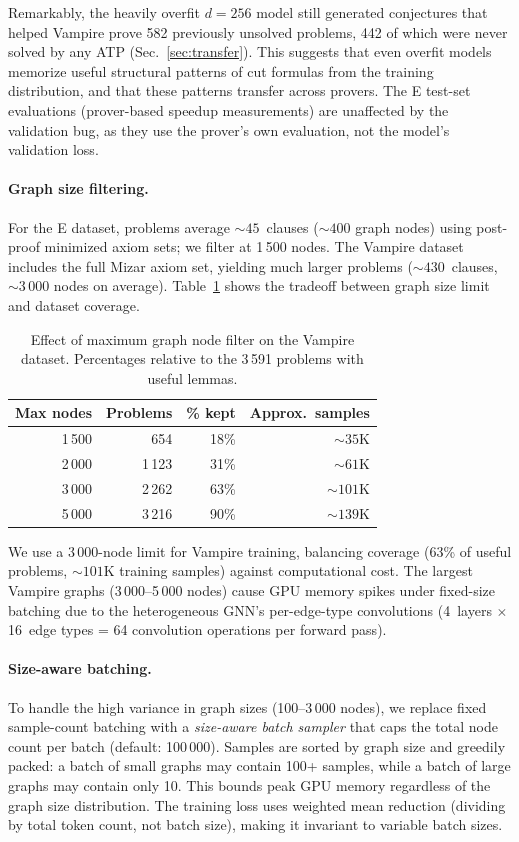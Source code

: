 \documentclass{easychair}
\newcommand{\Eprover}{E\xspace}
\newcommand{\Vampire}{Vampire\xspace}
\newcommand{\Mizar}{Mizar\xspace}
\begin{document}
Remarkably, the heavily overfit $d{=}256$ model still generated
conjectures that helped \Vampire prove 582 previously unsolved
problems, 442 of which were never solved by any ATP
(Sec.~\ref{sec:transfer}).  This suggests that even
overfit models memorize useful structural patterns of cut formulas
from the training distribution, and that these patterns transfer
across provers.  The \Eprover test-set evaluations (prover-based
speedup measurements) are unaffected by the validation bug, as they
use the prover's own evaluation, not the model's validation loss.

\paragraph{Graph size filtering.}
For the \Eprover dataset, problems average ${\sim}45$~clauses
(${\sim}400$ graph nodes) using post-proof minimized axiom sets; we
filter at 1\,500 nodes.  The \Vampire dataset includes the full
\Mizar axiom set, yielding much larger problems (${\sim}430$~clauses,
${\sim}3\,000$ nodes on average).  Table~\ref{tab:nodefilter} shows
the tradeoff between graph size limit and dataset coverage.

\begin{table}[t]
\centering
\caption{Effect of maximum graph node filter on the \Vampire dataset.
  Percentages relative to the 3\,591 problems with useful lemmas.}
\label{tab:nodefilter}
\small
\begin{tabular}{rrrr}
\toprule
Max nodes & Problems & \% kept & Approx.\ samples \\
\midrule
1\,500 &    654 &  18\% & ${\sim}35$K \\
2\,000 &  1\,123 &  31\% & ${\sim}61$K \\
3\,000 &  2\,262 &  63\% & ${\sim}101$K \\
5\,000 &  3\,216 &  90\% & ${\sim}139$K \\
\bottomrule
\end{tabular}
\end{table}

We use a 3\,000-node limit for \Vampire training, balancing coverage
(63\% of useful problems, ${\sim}101$K training samples) against
computational cost.  The largest \Vampire graphs (3\,000--5\,000
nodes) cause GPU memory spikes under fixed-size batching due to the
heterogeneous GNN's per-edge-type convolutions (4~layers $\times$
16~edge types = 64 convolution operations per forward pass).

\paragraph{Size-aware batching.}
To handle the high variance in graph sizes (100--3\,000 nodes), we
replace fixed sample-count batching with a \emph{size-aware batch
sampler} that caps the total node count per batch (default:
100\,000).  Samples are sorted by graph size and greedily packed: a
batch of small graphs may contain 100+ samples, while a batch of
large graphs may contain only 10.  This bounds peak GPU memory
regardless of the graph size distribution.  The training loss uses
weighted mean reduction (dividing by total token count, not batch
size), making it invariant to variable batch sizes.
\end{document}
